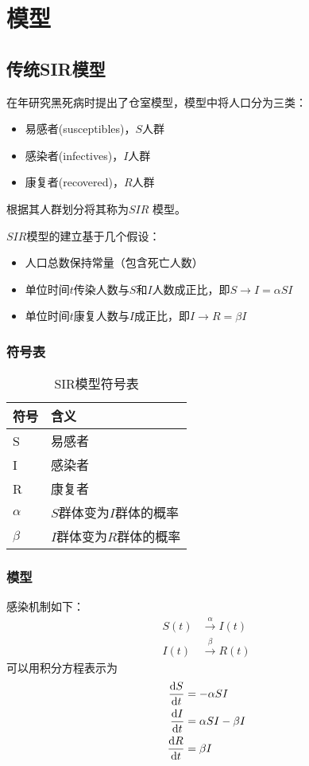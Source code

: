 \section{模型}
\subsection{传统SIR模型}
\citeauthor{对流行病数学理论的贡献}在\citeyear{对流行病数学理论的贡献}年研究黑死病时提出了仓室模型，模型中将人口分为三类：
\begin{itemize}
    \item 易感者(susceptibles)，$S$人群
    \item 感染者(infectives)，$I$人群
    \item 康复者(recovered)，$R$人群
\end{itemize}
\par 根据其人群划分将其称为$SIR$
\cite{对流行病数学理论的贡献}模型。
\par $SIR$模型的建立基于几个假设\cite{对流行病数学理论的贡献}：
\begin{itemize}
    \item 人口总数保持常量（包含死亡人数）
    \item 单位时间$t$传染人数与$S$和$I$人数成正比，即$S\to I = \alpha SI$
    \item 单位时间$t$康复人数与$I$成正比，即$I\to R = \beta I$
\end{itemize}
\subsubsection{符号表}
\begin{table}[H]
    \centering
    \caption{SIR模型符号表}
    \label{table:SIR模型符号表}
    \begin{tabular}{ll}
        \hline
        符号     & 含义                     \\
        \hline
        S        & 易感者                   \\
        I        & 感染者                   \\
        R        & 康复者                   \\
        $\alpha$ & $S$群体变为$I$群体的概率 \\
        $\beta$  & $I$群体变为$R$群体的概率 \\
        \hline
    \end{tabular}
\end{table}
\subsubsection{模型}
\par 感染机制如下：
\begin{align}
    S(t) & \xrightarrow \alpha I(t) \\
    I(t) & \xrightarrow \beta R(t)
\end{align}
可以用积分方程表示为
\begin{align}
    \frac{\mathrm{d}S}{\mathrm{d}t} & = -\alpha SI          \\
    \frac{\mathrm{d}I}{\mathrm{d}t} & = \alpha SI - \beta I \\
    \frac{\mathrm{d}R}{\mathrm{d}t} & = \beta I
\end{align}
